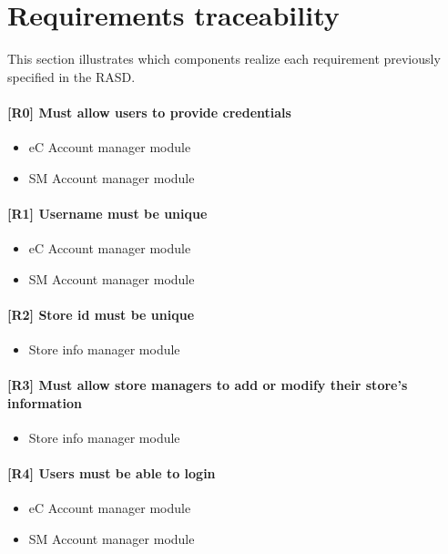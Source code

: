 
\section{Requirements traceability}
\label{sect:trace}

This section illustrates which components realize each requirement previously specified in the RASD.

\paragraph{[R0] Must allow users to provide credentials}
\begin{itemize}[itemsep=-1mm, topsep=-1mm]
	\item eC Account manager module
	\item SM Account manager module	
\end{itemize}

\paragraph{[R1] Username must be unique}
\begin{itemize}[itemsep=-1mm, topsep=-1mm]
	\item eC Account manager module
	\item SM Account manager module
\end{itemize}

\paragraph{[R2] Store id must be unique}
\begin{itemize}[itemsep=-1mm, topsep=-1mm]
	\item Store info manager module
\end{itemize}

\paragraph{[R3] Must allow store managers to add or modify their store’s information}
\begin{itemize}[itemsep=-1mm, topsep=-1mm]
	\item Store info manager module
\end{itemize}

\paragraph{[R4] Users must be able to login}
\begin{itemize}[itemsep=-1mm, topsep=-1mm]
	\item eC Account manager module
	\item SM Account manager module
\end{itemize}

